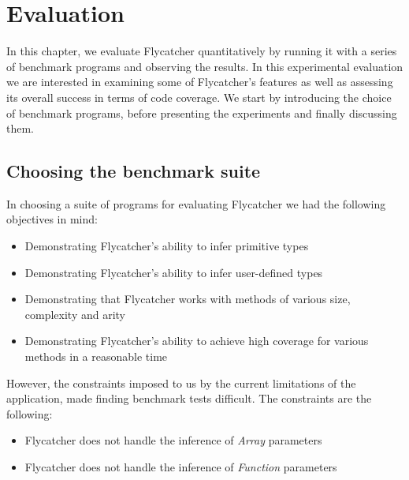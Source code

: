 \chapter{Evaluation}
In this chapter, we evaluate \textsf{Flycatcher} quantitatively by running it with a series of benchmark programs and observing the results. In this experimental evaluation we are interested in examining some of \textsf{Flycatcher}'s features as well as assessing its overall success in terms of code coverage. We start by introducing the choice of benchmark programs, before presenting the experiments and finally discussing them.


\section{Choosing the benchmark suite}
In choosing a suite of programs for evaluating \textsf{Flycatcher} we had the following objectives in mind:

\begin{itemize}
   \item Demonstrating \textsf{Flycatcher}'s ability to infer primitive types
   \item Demonstrating \textsf{Flycatcher}'s ability to infer user-defined types
   \item Demonstrating that \textsf{Flycatcher} works with methods of various size, complexity and arity
   \item Demonstrating \textsf{Flycatcher}'s ability to achieve high coverage for various methods in a reasonable time
\end{itemize}

However, the constraints imposed to us by the current limitations of the application, made finding benchmark tests difficult. The constraints are the following:

\begin{itemize}
   \item \textsf{Flycatcher} does not handle the inference of \textit{Array} parameters
   \item \textsf{Flycatcher} does not handle the inference of \textit{Function} parameters
\end{itemize}

